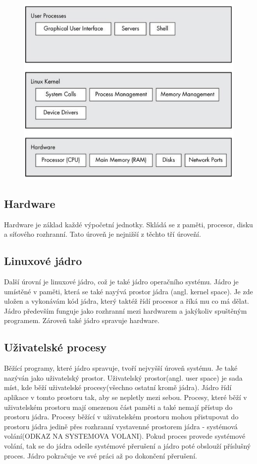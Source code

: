 \begin{figure}
    \centering
    \includegraphics{obrazky-figures/linux_structure.png}
    \caption{}
    \label{}
\end{figure}

\subsection{Hardware}
Hardware je základ každé výpočetní jednotky. Skládá se z paměti, procesor, disku a síťového rozhranní. Tato úroveň je nejnižší z těchto tří
úroveňí.

\subsection{Linuxové jádro}
Další úrovní je linuxové jádro, což je také jádro operačního systému. Jádro je umístěné v paměti, která se také nayývá prostor jádra
(angl. kernel space). Je zde uložen a vykonávám kód jádra, který taktéž řídí procesor a říká mu co má dělat.
Jádro především funguje jako rozhranní mezi hardwarem a jakýkoliv spuštěným programem. Zároveň také jádro spravuje hardware.

\subsection{Uživatelské procesy}
Běžící programy, které jádro spravuje, tvoří nejvyšší úroveň systému. Je také nazýván jako uživatelský prostor.
Uživatelský prostor(angl. user space) je sada míst, kde běží uživatelské procesy(všechno ostatní kromě jádra). Jádro řídí aplikace v tomto
prostoru tak, aby se nepletly mezi sebou. Procesy, které běží v uživatelském prostoru mají omezenou část paměti a také nemají přístup do
prostoru jádra. Procesy běžící v uživatelském prostoru mohou přistupovat do prostoru jádra jedině přes rozhranní vystavenné prostorem
jádra - systémová volání(ODKAZ NA SYSTEMOVA VOLANI). Pokud proces provede systémové volání, tak se do jádra odešle systémové přerušení
a jádro poté obslouží příslušný proces. Jádro pokračuje ve své práci až po dokončení přerušení.

